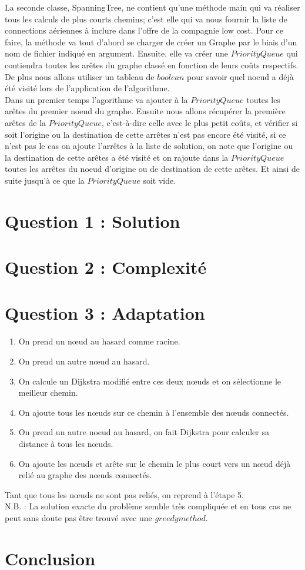 \documentclass[10pt,a4paper]{article}
\begin{document}
La seconde classe, SpanningTree, ne contient qu'une méthode main qui va réaliser tous les calculs de plus courts chemins; c'est elle qui va nous fournir la liste de connections aériennes à inclure dans l'offre de la compagnie low cost. Pour ce faire, la méthode va tout d'abord se charger de créer un Graphe par le biais d'un nom de fichier indiqué en argument. Ensuite, elle va créer une $PriorityQueue$ qui contiendra toutes les arêtes du graphe classé en fonction de leurs coûts respectifs. De plus nous allons utiliser un tableau de $boolean$ pour savoir quel noeud a déjà été visité lors de l'application de l'algorithme.\\

Dans un premier temps l'agorithme va ajouter à la $PriorityQueue$ toutes les arêtes du premier noeud du graphe. Ensuite nous allons récupérer la première arêtes de la $PriorityQueue$, c'est-à-dire celle avec le plus petit coûts, et vérifier si soit l'origine ou la destination de cette arrêtes n'est pas encore été visité, si ce n'est pas le cas on ajoute l'arrêtes à la liste de solution, on note que l'origine ou la destination de cette arêtes a été visité et on rajoute dans la $PriorityQueue$ toutes les arrêtes du noeud d'origine ou de destination de cette arêtes. Et ainsi de suite jusqu'à ce que la $PriorityQueue$ soit vide.

\section*{Question 1 : Solution}

\section*{Question 2 : Complexité}

\section*{Question 3 : Adaptation}

\begin{enumerate}
\item On prend un nœud au hasard comme racine.
\item On prend un autre nœud au hasard.
\item On calcule un Dijkstra modifié entre ces deux nœuds et on sélectionne le meilleur chemin.
\item On ajoute tous les nœuds sur ce chemin à l'ensemble des nœuds connectés.
\item On prend un autre noeud au hasard, on fait Dijkstra pour calculer sa distance à tous les nœuds.
\item On ajoute les nœuds et arête sur le chemin le plus court vers un nœud déjà relié au graphe des nœuds connectés.
\end{enumerate}

Tant que tous les nœuds ne sont pas reliés, on reprend à l'étape 5.\\

N.B. : La solution exacte du problème semble très compliquée et en tous cas ne peut sans doute pas être trouvé avec une $greedy method$.

\section*{Conclusion}
\end{document}
